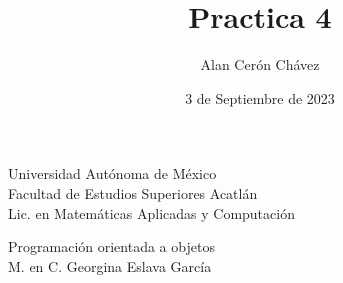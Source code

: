 \documentclass[12pt]{article}
\author{Alan Cerón Chávez}
\title{Practica 4}
\date{3 de Septiembre de 2023}
\begin{document}
\maketitle
\thispagestyle{empty}

\begin{center}
    \LARGE{Universidad Autónoma de México}\\\medskip
    \Large{Facultad de Estudios Superiores Acatlán}\\
    \Large{Lic. en Matemáticas Aplicadas y Computación}\\\medskip

    \large{Programación orientada a objetos}\\
    \large{M. en C. Georgina Eslava García}\\\medskip
\end{center}
\end{document}
